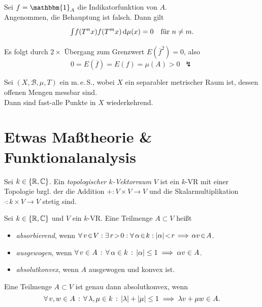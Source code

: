 \documentclass{cheat-sheet}
\newcommand{\Bor}{\mathcal{B}} %
\newcommand{\meS}{m.\,e.\,S.} %
\newcommand{\meST}{$(X, \Bor, \mu, T)$} %
\newcommand{\ind}{\mathbbm{1}} %
\begin{document}
\begin{beweis}
  Sei $f = \ind_A$ die Indikatorfunktion von $A$. \\
  Angenommen, die Behauptung ist falsch. Dann gilt
  \[
    {\textstyle \int\limits_{}^{}} f(T^n x)f(T^m x) \,\mathrm{d} \mu(x) = 0 \quad
    \text{für $n \neq m$.}
  \]
  Es folgt durch $2 \times$ Übergang zum Grenzwert $E(\overline{f}^2) = 0$, also
  \[ 0 = E(\overline{f}) = E(f) = \mu(A) > 0 \enspace \lightning \]
\end{beweis}

\begin{thm}
  Sei \meST{} ein \meS{}, wobei $X$ ein separabler metrischer Raum ist, dessen offenen Mengen messbar sind. \\
  Dann sind fast-alle Punkte in $X$ wiederkehrend.
\end{thm}

\section{Etwas Maßtheorie \& Funktionalanalysis}

\begin{defn}
  Sei $k \in \{ \mathbb{R}, \mathbb{C} \}$.
  Ein \emph{topologischer $k$-Vektorraum} $V$ ist ein $k$-VR mit einer Topologie bzgl. der die Addition $+ : V \times V \to V$ und die Skalarmultiplikation $\cdot : k \times V \to V$ stetig sind.
\end{defn}

\begin{defn}
  Sei $k \in \{ \mathbb{R}, \mathbb{C} \}$ und $V$ ein $k$-VR.
  Eine Teilmenge $A \subset V$ heißt
  \begin{itemize}
    \item \emph{absorbierend}, wenn
    $\fa{v \!\in\! V\!}\! \ex{r \!>\! 0\!}\! \fa{\alpha \!\in\! k\!}\! \abs{\alpha} \!<\! r \!\implies\! \alpha v \!\in\! A$.
    \item \emph{ausgewogen}, wenn $\forall \, {v \in A} \,:\, \forall \, {\alpha \in k} \,:\, \lvert\alpha\rvert \leq 1 \implies \alpha v \in A$.
    \item \emph{absolutkonvex}, wenn $A$ ausgewogen und konvex ist.
  \end{itemize}
\end{defn}

\begin{lem}
  Eine Teilmenge $A \!\subset\! V$ ist genau dann absolutkonvex, wenn
  \[ \forall \, {v, w \in A} \,:\, \forall \, {\lambda, \mu \in k} \,:\, \lvert\lambda\rvert + \lvert\mu\rvert \leq 1 \implies \lambda v + \mu w \in A. \]
\end{lem}
\end{document}

